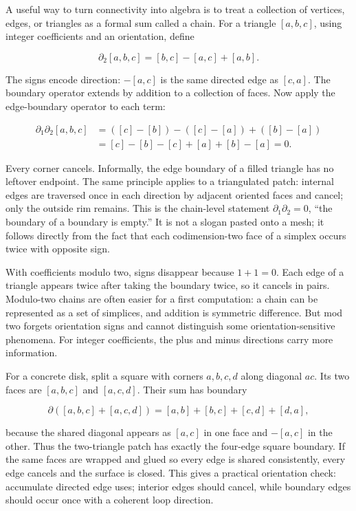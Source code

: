 \hypertarget{03-visual-computing-i-ch002-the-boundary-of-a-boundary-cancels}{}

A useful way to turn connectivity into algebra is to treat a collection of vertices, edges, or triangles as a formal sum called a chain. For a triangle \([a,b,c]\), using integer coefficients and an orientation, define

\[
\partial_2[a,b,c]=[b,c]-[a,c]+[a,b].
\]

The signs encode direction: \(-[a,c]\) is the same directed edge as \([c,a]\). The boundary operator extends by addition to a collection of faces. Now apply the edge-boundary operator to each term:

\[
\begin{aligned}
\partial_1\partial_2[a,b,c]
&=([c]-[b])-([c]-[a])+([b]-[a])\\
&=[c]-[b]-[c]+[a]+[b]-[a]=0.
\end{aligned}
\]

Every corner cancels. Informally, the edge boundary of a filled triangle has no leftover endpoint. The same principle applies to a triangulated patch: internal edges are traversed once in each direction by adjacent oriented faces and cancel; only the outside rim remains. This is the chain-level statement \(\partial_1\partial_2=0\), ``the boundary of a boundary is empty.'' It is not a slogan pasted onto a mesh; it follows directly from the fact that each codimension-two face of a simplex occurs twice with opposite sign.

With coefficients modulo two, signs disappear because \(1+1=0\). Each edge of a triangle appears twice after taking the boundary twice, so it cancels in pairs. Modulo-two chains are often easier for a first computation: a chain can be represented as a set of simplices, and addition is symmetric difference. But mod two forgets orientation signs and cannot distinguish some orientation-sensitive phenomena. For integer coefficients, the plus and minus directions carry more information.

For a concrete disk, split a square with corners \(a,b,c,d\) along diagonal \(ac\). Its two faces are \([a,b,c]\) and \([a,c,d]\). Their sum has boundary

\[
\partial([a,b,c]+[a,c,d])=[a,b]+[b,c]+[c,d]+[d,a],
\]

because the shared diagonal appears as \([a,c]\) in one face and \(-[a,c]\) in the other. Thus the two-triangle patch has exactly the four-edge square boundary. If the same faces are wrapped and glued so every edge is shared consistently, every edge cancels and the surface is closed. This gives a practical orientation check: accumulate directed edge uses; interior edges should cancel, while boundary edges should occur once with a coherent loop direction.

